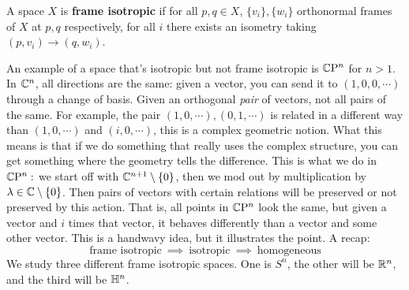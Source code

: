 \begin{definition}[]
    A space $X$ is \textbf{frame isotropic} if for all $p,q \in X$, $\{v_i \} ,\{w_i \} $ orthonormal frames of $X$ at $p,q$ respectively, for all $i$ there exists an isometry taking $(p,v_i )\to (q,w_i )$. 
\end{definition}

An example of a space that's isotropic but not frame isotropic is $\mathbb{C}\mathrm P^n $ for $n>1$. In $\mathbb{C}^n $, all directions are the same: given a vector, you can send it to $(1,0,0,\cdots )$ through a change of basis. Given an orthogonal \emph{pair} of vectors, not all pairs of the same. For example, the pair $(1,0,\cdots ),(0,1,\cdots )$ is related in a different way than $(1,0,\cdots )$ and $(i,0,\cdots )$, this is a complex geometric notion. What this means is that if we do something that really uses the complex structure, you can get something where the geometry tells the difference. This is what we do in $\mathbb{C}\mathrm P^n :$ we start off with $\mathbb{C}^{n+1}\setminus \{0\} $, then we mod out by multiplication by $\lambda \in \mathbb{C} \setminus \{0\} $. Then pairs of vectors with certain relations will be preserved or not preserved by this action. That is, all points in $\mathbb{C}\mathrm P^n $ look the same, but given a vector and $i$ times that vector, it behaves differently than a vector and some other vector. This is a handwavy idea, but it illustrates the point. A recap:
\[
    \text{frame isotropic} \ \implies \ \text{isotropic} \ \implies \ \text{homogeneous} 
\] 
We study three different frame isotropic spaces. One is $S^n $, the other will be $\mathbb{R}^n $, and the third will be $\mathbb{H}^n $.

